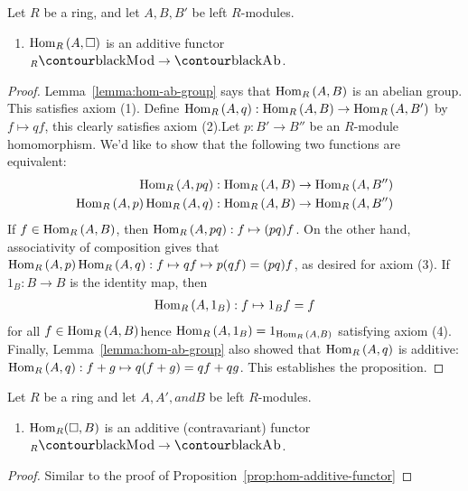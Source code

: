         \begin{proposition}\label{prop:hom-additive-functor}
            Let $R$ be a ring, and let $A,B,B'$ be left $R$-modules.
            \begin{enumerate}[label = (\arabic*)]
                \item $\operatorname{Hom}_R{(A,\square)}$ is an additive functor ${}_{R}\cMod \rightarrow \cAb$.
            \end{enumerate}
        \end{proposition}
            \begin{proof}
                Lemma~\ref{lemma:hom-ab-group} says that $\operatorname{Hom}_R{(A,B)}$ is an abelian group. This satisfies axiom (1). Define $\operatorname{Hom}_R{(A,q)}: \operatorname{Hom}_R{(A,B)} \rightarrow \operatorname{Hom}_R{(A,B')}$ by $f \mapsto qf$, this clearly satisfies axiom (2).Let $p:B' \rightarrow B''$ be an $R$-module homomorphism. We'd like to show that the following two functions are equivalent:
                    \begin{equation*}
                    \begin{split}
                        \operatorname{Hom}_R{(A,pq)}:\operatorname{Hom}_R{(A,B)} \rightarrow \operatorname{Hom}_R{(A,B'')} \\
                        \operatorname{Hom}_R{(A,p)}\operatorname{Hom}_R{(A,q)}:\operatorname{Hom}_R{(A,B)} \rightarrow \operatorname{Hom}_R{(A,B'')}
                    \end{split}
                    \end{equation*}
                If $f \in \operatorname{Hom}_R{(A,B)}$, then $\operatorname{Hom}_R{(A,pq)}:f \mapsto (pq)f$. On the other hand, associativity of composition gives that $\operatorname{Hom}_R{(A,p)}\operatorname{Hom}_R{(A,q)}:f \mapsto qf \mapsto p(qf) = (pq)f$, as desired for axiom (3). If $1_B : B \rightarrow B$ is the identity map, then
                    \begin{equation*}
                    \begin{split}
                        \operatorname{Hom}_R{(A,1_B)}:f \mapsto 1_B f = f
                    \end{split}
                    \end{equation*}
                for all $f \in \operatorname{Hom}_R{(A,B)}$\textemdash hence $\operatorname{Hom}_R{(A,1_B)} = 1_{\operatorname{Hom}_R{(A,B)}}$ satisfying axiom (4). Finally, Lemma~\ref{lemma:hom-ab-group} also showed that $\operatorname{Hom}_R{(A,q)}$ is additive: $\operatorname{Hom}_R{(A,q)}:f+g \mapsto q(f+g) = qf + qg$. This establishes the proposition.
            \end{proof}

        \begin{proposition}
            Let $R$ be a ring and let $A, A', and B$ be left $R$-modules.
                \begin{enumerate}[label = (\arabic*)]
                    \item $\operatorname{Hom}_R(\square, B)$ is an additive (contravariant) functor ${}_{R}\cMod \rightarrow \cAb$.
                \end{enumerate}
        \end{proposition}
            \begin{proof}
                Similar to the proof of Proposition~\ref{prop:hom-additive-functor}
            \end{proof}

